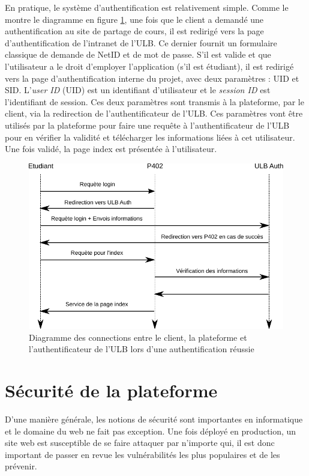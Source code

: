 \documentclass[a4paper,12pt]{article}
\begin{document}
En pratique, le système d'authentification est relativement simple. Comme le montre
le diagramme en figure \ref{fig:auth}, une fois que le client a demandé une
authentification au site de partage de cours, il est redirigé vers la page d'authentification
de l'intranet de l'ULB. Ce dernier fournit un formulaire classique de demande de
NetID et de mot de passe. S'il est valide et que l'utilisateur a le droit d'employer
l'application (s'il est étudiant), il est redirigé vers la page d'authentification
interne du projet, avec deux paramètres : UID et SID. L'\textit{user ID} (UID) est
un identifiant d'utilisateur et le \textit{session ID} est l'identifiant de session.
Ces deux paramètres sont transmis à la plateforme, par le client, via la redirection de l'authentificateur
de l'ULB. Ces paramètres vont être utilisés par la plateforme pour faire
une requête à l'authentificateur de l'ULB pour en vérifier la validité et télécharger
les informations liées à cet utilisateur. Une fois validé, la page index est présentée à
l'utilisateur.

\begin{figure}
  \centering\includegraphics[scale=0.9]{imgs/auth.pdf}
  \caption{Diagramme des connections entre le client, la plateforme et l'authentificateur
de l'ULB lors d'une authentification réussie}
  \label{fig:auth}
\end{figure}

\section{Sécurité de la plateforme}

D'une manière générale, les notions de sécurité sont importantes en informatique
et le domaine du web ne fait pas exception. Une fois déployé en production,
un site web est susceptible de se faire attaquer par n'importe qui, il est donc
important de passer en revue les vulnérabilités les plus populaires et de les prévenir.
\end{document}
